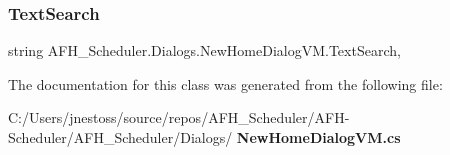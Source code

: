 \mbox{\label{class_a_f_h___scheduler_1_1_dialogs_1_1_new_home_dialog_v_m_a36b82980a5d0a7d5bb6174dd38a67fc2}} 
\subsubsection{TextSearch}
{\footnotesize\ttfamily string A\+F\+H\+\_\+\+Scheduler.\+Dialogs.\+New\+Home\+Dialog\+V\+M.\+Text\+Search\hspace{0.3cm}{\ttfamily [get]}, {\ttfamily [set]}}



The documentation for this class was generated from the following file\+:\begin{DoxyCompactItemize}
\item 
C\+:/\+Users/jnestoss/source/repos/\+A\+F\+H\+\_\+\+Scheduler/\+A\+F\+H-\/\+Scheduler/\+A\+F\+H\+\_\+\+Scheduler/\+Dialogs/\textbf{ New\+Home\+Dialog\+V\+M.\+cs}\end{DoxyCompactItemize}
